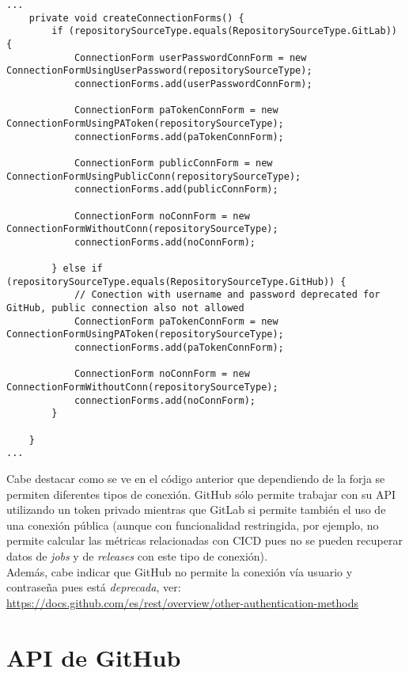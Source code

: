 \begin{minipage}{\linewidth}
{\tiny
\begin{verbatim}
...
	private void createConnectionForms() {
		if (repositorySourceType.equals(RepositorySourceType.GitLab)) {
			ConnectionForm userPasswordConnForm = new ConnectionFormUsingUserPassword(repositorySourceType);
			connectionForms.add(userPasswordConnForm);

			ConnectionForm paTokenConnForm = new ConnectionFormUsingPAToken(repositorySourceType);
			connectionForms.add(paTokenConnForm);

			ConnectionForm publicConnForm = new ConnectionFormUsingPublicConn(repositorySourceType);
			connectionForms.add(publicConnForm);

			ConnectionForm noConnForm = new ConnectionFormWithoutConn(repositorySourceType);
			connectionForms.add(noConnForm);
			
		} else if (repositorySourceType.equals(RepositorySourceType.GitHub)) {
			// Conection with username and password deprecated for GitHub, public connection also not allowed
			ConnectionForm paTokenConnForm = new ConnectionFormUsingPAToken(repositorySourceType);
			connectionForms.add(paTokenConnForm);

			ConnectionForm noConnForm = new ConnectionFormWithoutConn(repositorySourceType);
			connectionForms.add(noConnForm);
		}
	
	}
...
\end{verbatim}
}
\end{minipage}

Cabe destacar como se ve en el código anterior que dependiendo de la forja se permiten diferentes tipos de conexión. GitHub sólo permite trabajar con su API utilizando un token privado mientras que GitLab si permite también el uso de una conexión pública (aunque con funcionalidad restringida, por ejemplo, no permite calcular las métricas relacionadas con CICD pues no se pueden recuperar datos de \textit{jobs} y de \textit{releases} con este tipo de conexión).\\
Además, cabe indicar que GitHub no permite la conexión vía usuario y contraseña pues está \textit{deprecada}, ver:\\
\url{https://docs.github.com/es/rest/overview/other-authentication-methods}

\newpage
\section{API de GitHub} 


